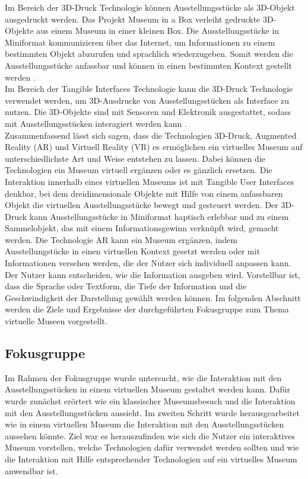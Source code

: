 \documentclass[runningheads,a4paper]{llncs}
\begin{document}
Im Bereich der 3D-Druck Technologie können Ausstellungsstücke als 3D-Objekt ausgedruckt werden. Das Projekt Museum in a Box verleiht gedruckte 3D-Objekte aus einem Museum in einer kleinen Box. Die Ausstellungsstücke in Miniformat kommunizieren über das Internet, um Informationen zu einem bestimmten Objekt abzurufen und sprachlich wiederzugeben. Somit werden die Ausstellungsstücke anfassbar und können in einen bestimmten Kontext gestellt werden \cite{GeorgeOates.2015}.\\

Im Bereich der Tangible Interfaces Technologie kann die 3D-Druck Technologie verwendet werden, um 3D-Ausdrucke von Ausstellungsstücken als Interface zu nutzen. Die 3D-Objekte sind mit Sensoren und Elektronik ausgestattet, sodass mit Ausstellungsstücken interagiert werden kann \cite{Capurro.2015}.\\ 

Zusammenfassend lässt sich sagen, dass die Technologien 3D-Druck, Augmented Reality (AR) und Virtuell Reality (VR) es ermöglichen ein virtuelles Museum auf unterschiedlichste Art und Weise entstehen zu lassen. Dabei können die Technologien ein Museum virtuell ergänzen oder es gänzlich ersetzen. Die Interaktion innerhalb eines virtuellen Museums ist mit Tangible User Interfaces denkbar, bei dem dreidimensionale Objekte mit Hilfe von einem anfassbaren Objekt die virtuellen Ausstellungsstücke bewegt und gesteuert werden. Der 3D-Druck kann Ausstellungsstücke in Miniformat haptisch erlebbar und zu einem Sammelobjekt, das mit einem Informationsgewinn verknüpft wird, gemacht werden. Die Technologie AR kann ein Museum ergänzen, indem Ausstellungstücke in einen virtuellen Kontext gesetzt werden oder mit Informationen versehen werden, die der Nutzer sich individuell anpassen kann. Der Nutzer kann entscheiden, wie die Information ausgeben wird. Vorstellbar ist, dass die Sprache oder Textform, die Tiefe der Information und die Geschwindigkeit der Darstellung gewählt werden können. Im folgenden Abschnitt werden die Ziele und Ergebnisse der durchgeführten Fokusgruppe zum Thema virtuelle Museen vorgestellt.\\

\subsection{Fokusgruppe}
Im Rahmen der Fokusgruppe wurde untersucht, wie die Interaktion mit den Ausstellungsstücken in einem virtuellen Museum gestaltet werden kann. Dafür wurde zunächst erörtert wie ein klassischer Museumsbesuch und die Interaktion mit den Ausstellungsstücken aussieht. Im zweiten Schritt wurde herausgearbeitet wie in einem virtuellen Museum die Interaktion mit den Ausstellungsstücken aussehen könnte. Ziel war es herauszufinden wie sich die Nutzer ein interaktives Museum vorstellen, welche Technologien dafür verwendet werden sollten und wie die Interaktion mit Hilfe entsprechender Technologien auf ein virtuelles Museum anwendbar ist.\\
\end{document}
